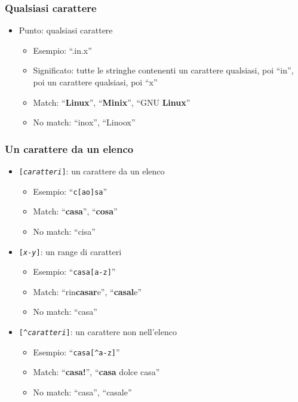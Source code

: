 \documentclass[xetex,table]{beamer}
\begin{document}
\begin{frame}
  \frametitle{Qualsiasi carattere}
  \begin{itemize}
  \item Punto: qualsiasi carattere
    \begin{itemize}
    \item Esempio: ``.in.x''
    \item Significato: tutte le stringhe contenenti un carattere
      qualsiasi, poi ``in'', poi un carattere qualsiasi, poi ``x''
    \item Match: ``{\bf Linux}'', ``{\bf Minix}'', ``GNU {\bf Linux}''
    \item No match: ``inox'', ``Linoox''
    \end{itemize}
  \end{itemize}
\end{frame}

\begin{frame}
  \frametitle{Un carattere da un elenco}
  \begin{itemize}
  \item \texttt{[{\em caratteri}]}: un carattere da un elenco
    \begin{itemize}
    \item Esempio: ``\texttt{c[ao]sa}''
    \item Match: ``{\bf casa}'', ``{\bf cosa}''
    \item No match: ``cisa''
    \end{itemize}
  \item \texttt{[{\em x-y}]}: un range di caratteri
    \begin{itemize}
    \item Esempio: ``\texttt{casa[a-z]}''
    \item Match: ``rin{\bf casar}e'', ``{\bf casal}e''
    \item No match: ``casa''
    \end{itemize}
  \item \texttt{[\^{}{\em caratteri}]}: un carattere non nell'elenco
    \begin{itemize}
    \item Esempio: ``\texttt{casa[\^{}a-z]}''
    \item Match: ``{\bf casa!}'', ``{\bf casa }dolce casa''
    \item No match: ``casa'', ``casale''
    \end{itemize}
  \end{itemize}
\end{frame}
\end{document}
